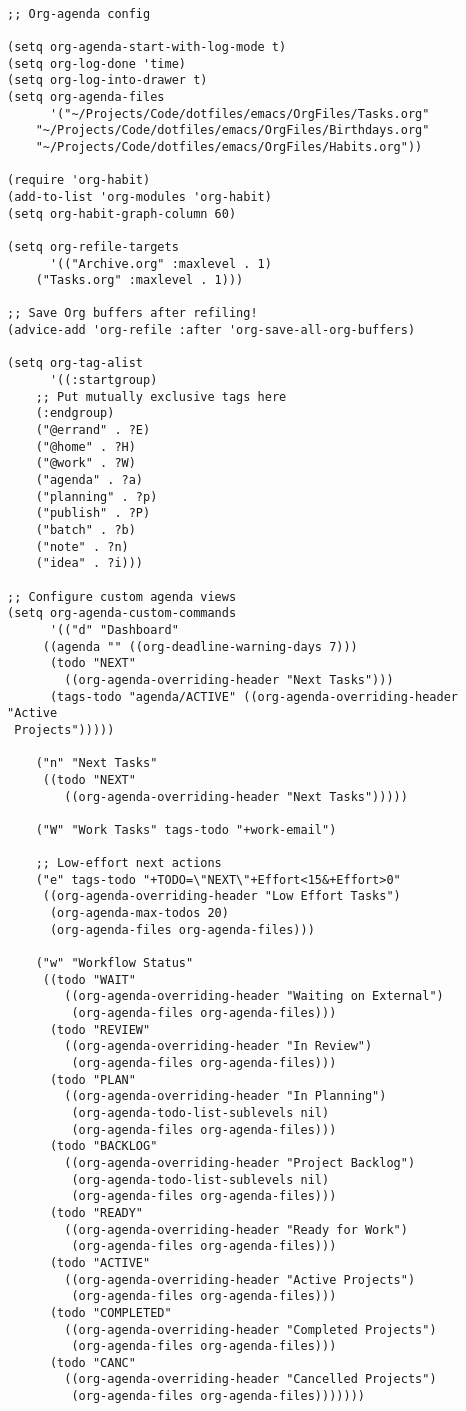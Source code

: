 \documentclass[11pt]{article}
\begin{document}
\begin{verbatim}

;; Org-agenda config

(setq org-agenda-start-with-log-mode t)
(setq org-log-done 'time)
(setq org-log-into-drawer t)
(setq org-agenda-files
      '("~/Projects/Code/dotfiles/emacs/OrgFiles/Tasks.org"
	"~/Projects/Code/dotfiles/emacs/OrgFiles/Birthdays.org"
	"~/Projects/Code/dotfiles/emacs/OrgFiles/Habits.org"))

(require 'org-habit)
(add-to-list 'org-modules 'org-habit)
(setq org-habit-graph-column 60)

(setq org-refile-targets
      '(("Archive.org" :maxlevel . 1)
	("Tasks.org" :maxlevel . 1)))

;; Save Org buffers after refiling!
(advice-add 'org-refile :after 'org-save-all-org-buffers)

(setq org-tag-alist
      '((:startgroup)
	;; Put mutually exclusive tags here
	(:endgroup)
	("@errand" . ?E)
	("@home" . ?H)
	("@work" . ?W)
	("agenda" . ?a)
	("planning" . ?p)
	("publish" . ?P)
	("batch" . ?b)
	("note" . ?n)
	("idea" . ?i)))

;; Configure custom agenda views
(setq org-agenda-custom-commands
      '(("d" "Dashboard"
	 ((agenda "" ((org-deadline-warning-days 7)))
	  (todo "NEXT"
		((org-agenda-overriding-header "Next Tasks")))
	  (tags-todo "agenda/ACTIVE" ((org-agenda-overriding-header "Active
 Projects")))))

	("n" "Next Tasks"
	 ((todo "NEXT"
		((org-agenda-overriding-header "Next Tasks")))))

	("W" "Work Tasks" tags-todo "+work-email")

	;; Low-effort next actions
	("e" tags-todo "+TODO=\"NEXT\"+Effort<15&+Effort>0"
	 ((org-agenda-overriding-header "Low Effort Tasks")
	  (org-agenda-max-todos 20)
	  (org-agenda-files org-agenda-files)))

	("w" "Workflow Status"
	 ((todo "WAIT"
		((org-agenda-overriding-header "Waiting on External")
		 (org-agenda-files org-agenda-files)))
	  (todo "REVIEW"
		((org-agenda-overriding-header "In Review")
		 (org-agenda-files org-agenda-files)))
	  (todo "PLAN"
		((org-agenda-overriding-header "In Planning")
		 (org-agenda-todo-list-sublevels nil)
		 (org-agenda-files org-agenda-files)))
	  (todo "BACKLOG"
		((org-agenda-overriding-header "Project Backlog")
		 (org-agenda-todo-list-sublevels nil)
		 (org-agenda-files org-agenda-files)))
	  (todo "READY"
		((org-agenda-overriding-header "Ready for Work")
		 (org-agenda-files org-agenda-files)))
	  (todo "ACTIVE"
		((org-agenda-overriding-header "Active Projects")
		 (org-agenda-files org-agenda-files)))
	  (todo "COMPLETED"
		((org-agenda-overriding-header "Completed Projects")
		 (org-agenda-files org-agenda-files)))
	  (todo "CANC"
		((org-agenda-overriding-header "Cancelled Projects")
		 (org-agenda-files org-agenda-files)))))))



\end{verbatim}
\end{document}
